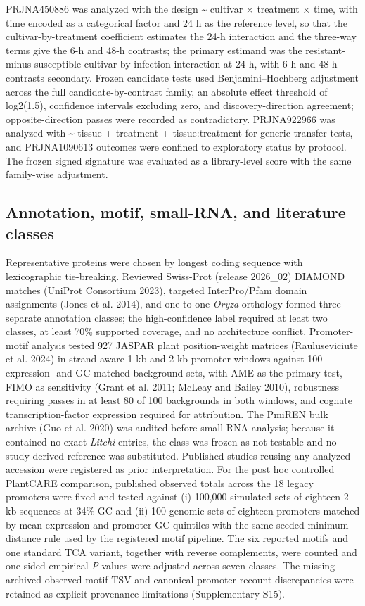 \documentclass[12pt,letterpaper]{article}
\begin{document}
PRJNA450886 was analyzed with the design \textasciitilde{} cultivar × treatment × time, with time encoded as a categorical factor and 24 h as the reference level, so that the cultivar-by-treatment coefficient estimates the 24-h interaction and the three-way terms give the 6-h and 48-h contrasts; the primary estimand was the resistant-minus-susceptible cultivar-by-infection interaction at 24 h, with 6-h and 48-h contrasts secondary. Frozen candidate tests used Benjamini–Hochberg adjustment across the full candidate-by-contrast family, an absolute effect threshold of log2(1.5), confidence intervals excluding zero, and discovery-direction agreement; opposite-direction passes were recorded as contradictory. PRJNA922966 was analyzed with \textasciitilde{} tissue + treatment + tissue:treatment for generic-transfer tests, and PRJNA1090613 outcomes were confined to exploratory status by protocol. The frozen signed signature was evaluated as a library-level score with the same family-wise adjustment.

\subsection*{Annotation, motif, small-RNA, and literature classes}

Representative proteins were chosen by longest coding sequence with lexicographic tie-breaking. Reviewed Swiss-Prot (release 2026\_02) DIAMOND matches (UniProt Consortium 2023), targeted InterPro/Pfam domain assignments (Jones et al. 2014), and one-to-one \textit{Oryza} orthology formed three separate annotation classes; the high-confidence label required at least two classes, at least 70\% supported coverage, and no architecture conflict. Promoter-motif analysis tested 927 JASPAR plant position-weight matrices (Rauluseviciute et al. 2024) in strand-aware 1-kb and 2-kb promoter windows against 100 expression- and GC-matched background sets, with AME as the primary test, FIMO as sensitivity (Grant et al. 2011; McLeay and Bailey 2010), robustness requiring passes in at least 80 of 100 backgrounds in both windows, and cognate transcription-factor expression required for attribution. The PmiREN bulk archive (Guo et al. 2020) was audited before small-RNA analysis; because it contained no exact \textit{Litchi} entries, the class was frozen as not testable and no study-derived reference was substituted. Published studies reusing any analyzed accession were registered as prior interpretation. For the post hoc controlled PlantCARE comparison, published observed totals across the 18 legacy promoters were fixed and tested against (i) 100,000 simulated sets of eighteen 2-kb sequences at 34\% GC and (ii) 100 genomic sets of eighteen promoters matched by mean-expression and promoter-GC quintiles with the same seeded minimum-distance rule used by the registered motif pipeline. The six reported motifs and one standard TCA variant, together with reverse complements, were counted and one-sided empirical \textit{P}-values were adjusted across seven classes. The missing archived observed-motif TSV and canonical-promoter recount discrepancies were retained as explicit provenance limitations (Supplementary S15).
\end{document}
